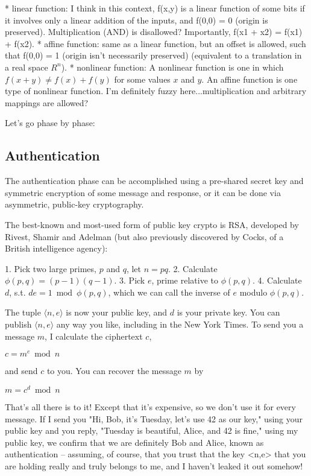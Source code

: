 \documentclass[%
 aip,
 jmp,%
 amsmath,amssymb,
 reprint,%
]{revtex4-1}
\begin{document}
* linear function: I think in this context, f(x,y) is a linear
  function of some bits if it involves only a linear addition of
  the inputs, and f(0,0) = 0 (origin is preserved).  Multiplication
  (AND) is disallowed?  Importantly, f(x1 + x2) = f(x1) + f(x2).
* affine function: same as a linear function, but an offset is
  allowed, such that f(0,0) = 1 (origin isn't necessarily preserved)
  (equivalent to a translation in a real space $R^n$).
* nonlinear function: A nonlinear function is one in which $f(x+y) \ne f(x) + f(y)$ for some values $x$ and $y$. An affine function is one type of nonlinear function. I'm definitely fuzzy here...multiplication and
  arbitrary mappings are allowed?


Let's go phase by phase:

\subsection{Authentication}

The authentication phase can be accomplished using a pre-shared secret
key and symmetric encryption of some message and response, or it can
be done via asymmetric, public-key cryptography.

The best-known and most-used form of public key crypto is RSA, developed by Rivest, Shamir and Adelman (but also previously discovered by Cocks, of a British intelligence agency):

	1. Pick two large primes, $p$ and $q$, let $n = pq$.
	2. Calculate $\phi(p,q) = (p-1)(q-1)$.
	3. Pick $e$, prime relative to $\phi(p,q)$.
	4. Calculate $d$, s.t. $de = 1 \bmod \phi(p,q)$,
	   which we can call the inverse of $e$ modulo $\phi(p,q)$.

The tuple $\langle n,e\rangle$ is now your public key, and $d$ is your private key.
You can publish $\langle n,e\rangle$ any way you like, including in the New York
Times. To send you a message $m$, I calculate the ciphertext $c$,

	$c = m^e \bmod n$

and send $c$ to you.  You can recover the message $m$ by

    	$m = c^d \bmod n$

That's all there is to it!  Except that it's expensive, so we don't
use it for every message.  If I send you "Hi, Bob, it's Tuesday, let's
use 42 as our key," using your public key and you reply, "Tuesday is
beautiful, Alice, and 42 is fine," using my public key, we confirm
that we are definitely Bob and Alice, known as authentication --
assuming, of course, that you trust that the key <n,e> that you are
holding really and truly belongs to me, and I haven't leaked it out
somehow!
\end{document}
